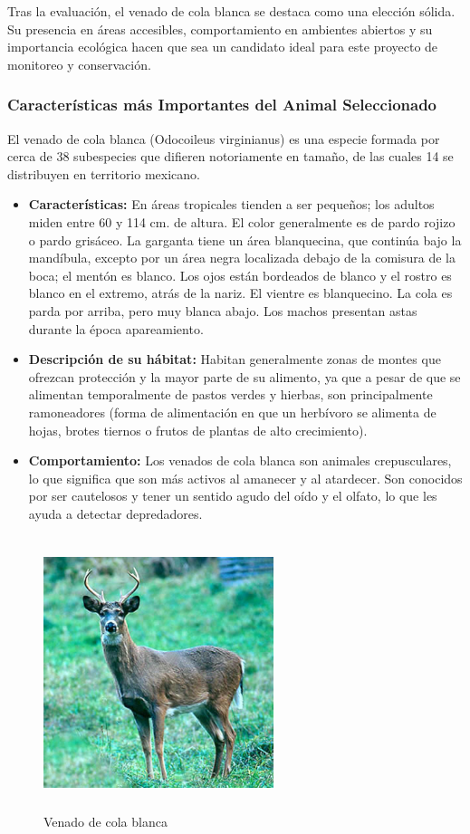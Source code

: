 \noindent Tras la evaluación, el venado de cola blanca se destaca como una elección sólida. Su presencia en áreas accesibles, comportamiento en ambientes abiertos y su importancia ecológica hacen que sea un candidato ideal para este proyecto de monitoreo y conservación.

\subsubsection{Características más Importantes del Animal Seleccionado}
 
El venado de cola blanca (Odocoileus virginianus) \cite{123} es una especie formada por cerca de 38 subespecies que difieren notoriamente en tamaño, de las cuales 14 se distribuyen en territorio mexicano. 
\begin{itemize}
\item \textbf{Características: } En áreas tropicales tienden a ser pequeños; los adultos miden entre 60 y 114 cm. de altura. El color generalmente es de pardo rojizo o pardo grisáceo. La garganta tiene un área blanquecina, que continúa bajo la mandíbula, excepto por un área negra localizada debajo de la comisura de la boca; el mentón es blanco. Los ojos están bordeados de blanco y el rostro es blanco en el extremo, atrás de la nariz. El vientre es blanquecino. La cola es parda por arriba, pero muy blanca abajo. Los machos presentan astas durante la época apareamiento.
\item \textbf{Descripción de su hábitat: } Habitan generalmente zonas de montes que ofrezcan protección y la mayor parte de su alimento, ya que a pesar de que se alimentan temporalmente de pastos verdes y hierbas, son principalmente ramoneadores (forma de alimentación en que un herbívoro se alimenta de hojas, brotes tiernos o frutos de plantas de alto crecimiento).
\item \textbf{Comportamiento: }Los venados de cola blanca son animales crepusculares, lo que significa que son más activos al amanecer y al atardecer. Son conocidos por ser cautelosos y tener un sentido agudo del oído y el olfato, lo que les ayuda a detectar depredadores.
\end{itemize}
\begin{figure}[h]
\centering
\includegraphics[width=0.6\textwidth, height=8cm]{imagenes/venado.jpg}
\caption{Venado de cola blanca}
\end{figure}



\endinput 